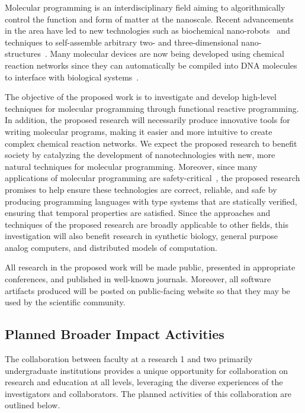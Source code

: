 

Molecular programming is an interdisciplinary field aiming to algorithmically control the function and form of matter at the nanoscale.
Recent advancements in the area have led to new technologies such as biochemical nano-robots~\cite{jDoBaCh12}  and techniques to self-assemble arbitrary two- and three-dimensional nano-structures~\cite{jRoth06,jDDLHGS09,jDMTVCS09,jKOSY12,benson2015dna,Juneaav0655}.
Many molecular devices are now being developed using chemical reaction networks since they can automatically be compiled into DNA molecules to interface with biological systems~\cite{cSoSeWi09,jLYCP12,jCard13,jCDSPCS13,jSPSWS17,cBSJDTW17}.

The objective of the proposed work is to investigate and develop high-level techniques for molecular programming through functional reactive programming.
In addition, the proposed research will necessarily produce innovative tools for writing molecular programs, making it easier and more intuitive to create complex chemical reaction networks.
We expect the proposed research to benefit society by catalyzing the development of nanotechnologies with new, more natural techniques for molecular programming.
Moreover, since many applications of molecular programming are safety-critical~\cite{jEKLLLM17,cLutz18}, the proposed research promises to help ensure these technologies are correct, reliable, and safe by producing programming languages with type systems that are statically verified, ensuring that temporal properties are satisfied.
Since the approaches and techniques of the proposed research are broadly applicable to other fields, this investigation will also benefit research in synthetic biology, general purpose analog computers, and distributed models of computation.

All research in the proposed work will be made public, presented in appropriate conferences, and published in well-known journals.
Moreover, all software artifacts produced will be posted on public-facing website so that they may be used by the scientific community.


\subsection{Planned Broader Impact Activities}
The collaboration between faculty at a research 1 and two primarily undergraduate institutions provides a unique opportunity for collaboration on research and education at all levels, leveraging the diverse experiences of the investigators and collaborators.
The planned activities of this collaboration are outlined below.  

